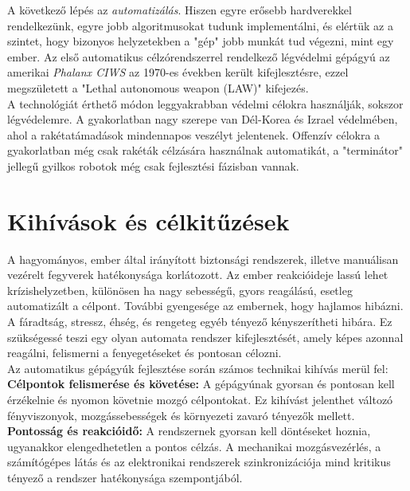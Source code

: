 A következő lépés az \textsl{automatizálás}. Hiszen egyre erősebb hardverekkel rendelkezünk, egyre jobb algoritmusokat tudunk implementálni, és elértük az a szintet, hogy bizonyos helyzetekben a "gép" jobb munkát tud végezni, mint egy ember. Az első automatikus célzórendszerrel rendelkező légvédelmi gépágyú az amerikai \textsl{Phalanx CIWS} \cite{CIWS} az 1970-es években került kifejlesztésre, ezzel megszületett a "Lethal autonomous weapon (LAW)" kifejezés.\\

A technológiát érthető módon leggyakrabban védelmi célokra használják, sokszor légvédelemre. A gyakorlatban nagy szerepe van Dél-Korea és Izrael védelmében, ahol a rakétatámadások mindennapos veszélyt jelentenek. Offenzív célokra a gyakorlatban még csak rakéták célzására használnak automatikát, a "terminátor" jellegű gyilkos robotok még csak fejlesztési fázisban vannak.


\section{Kihívások és célkitűzések}

A hagyományos, ember által irányított biztonsági rendszerek, illetve manuálisan vezérelt fegyverek hatékonysága korlátozott. Az ember reakcióideje lassú lehet krízishelyzetben, különösen ha nagy sebességű, gyors reagálású, esetleg automatizált a célpont. További gyengesége az embernek, hogy hajlamos hibázni. A fáradtság, stressz, éhség, és rengeteg egyéb tényező kényszerítheti hibára. Ez szükségessé teszi egy olyan automata rendszer kifejlesztését, amely képes azonnal reagálni, felismerni a fenyegetéseket és pontosan célozni.\\

Az automatikus gépágyúk fejlesztése során számos technikai kihívás merül fel:\\

\textbf{Célpontok felismerése és követése:} A gépágyúnak gyorsan és pontosan kell érzékelnie és nyomon követnie mozgó célpontokat. Ez kihívást jelenthet változó fényviszonyok, mozgássebességek és környezeti zavaró tényezők mellett. \\

\textbf{Pontosság és reakcióidő:} A rendszernek gyorsan kell döntéseket hoznia, ugyanakkor elengedhetetlen a pontos célzás. A mechanikai mozgásvezérlés, a számítógépes látás és az elektronikai rendszerek szinkronizációja mind kritikus tényező a rendszer hatékonysága szempontjából. \\


